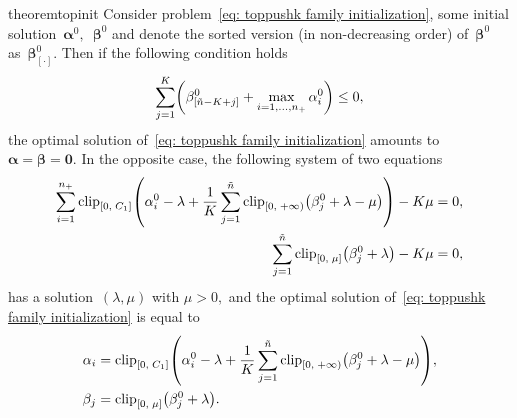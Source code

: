 \begin{restatable}{theorem}{topinit}\label{thm: toppushk family initialization}
  Consider problem~\eqref{eq: toppushk family initialization}, some initial solution~$\bm{\alpha}^0,$~$\bm{\beta}^0$ and denote the sorted version (in non-decreasing order) of~$\bm{\beta}^0$ as~$\bm{\beta}_{[\cdot]}^0.$ Then if the following condition holds
  \begin{equation}\label{eq:problem3_cond}
    \sum_{j = 1}^{K} \Brac{\beta_{[\ntil - K + j]}^0 + \max_{i = 1, \ldots, \npos} \alpha_i^0} \le 0,
  \end{equation}
  the optimal solution of~\eqref{eq: toppushk family initialization} amounts to~$\bm{\alpha} = \bm{\beta} = \bm{0}.$ In the opposite case, the following system of two equations
  \begin{subequations}\label{eq: toppushk family init alg}
    \begin{align}
      \sum_{i=1}^{\npos} \clip{0}{C_1}{ \alpha_i^0 - \lambda + \frac{1}{K} \sum_{j=1}^{\ntil} \clip[u]{0}{+\infty}{\beta_j^0 + \lambda - \mu}} - K \mu
      & = 0, \label{eq: toppushk family init alg 1} \\
      \sum_{j=1}^{\ntil} \clip{0}{\mu}{\beta_j^0 + \lambda} - K\mu
      & = 0, \label{eq: toppushk family init alg 2}
    \end{align}
  \end{subequations}
  has a solution~$(\lambda, \mu)$ with $\mu > 0,$ and the optimal solution of~\eqref{eq: toppushk family initialization} is equal to
  \begin{align*}
    \alpha_i
      & = \clip{0}{C_1}{\alpha_i^0 - \lambda + \frac{1}{K} \sum_{j=1}^{\ntil} \clip[u]{0}{+\infty}{\beta_j^0 + \lambda - \mu}}, \\
    \beta_j & = \clip{0}{\mu}{\beta_j^0 + \lambda}.
  \end{align*}
\end{restatable}

